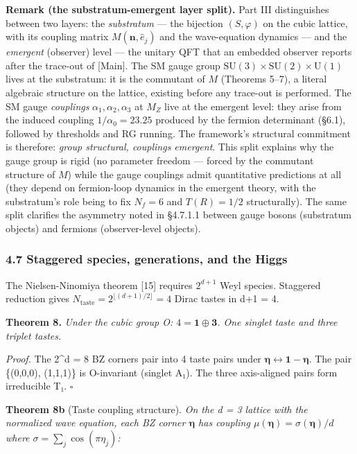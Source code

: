 \documentclass[
]{article}
\begin{document}
\textbf{Remark (the substratum-emergent layer split).} Part III
distinguishes between two layers: the \emph{substratum} --- the
bijection \((S, \varphi)\) on the cubic lattice, with its coupling
matrix \(M(\mathbf{n}, \hat e_j)\) and the wave-equation dynamics ---
and the \emph{emergent} (observer) level --- the unitary QFT that an
embedded observer reports after the trace-out of {[}Main{]}. The SM
gauge group
\(\mathrm{SU}(3) \times \mathrm{SU}(2) \times \mathrm{U}(1)\) lives at
the substratum: it is the commutant of \(M\) (Theorems 5--7), a literal
algebraic structure on the lattice, existing before any trace-out is
performed. The SM gauge \emph{couplings}
\(\alpha_1, \alpha_2, \alpha_3\) at \(M_Z\) live at the emergent level:
they arise from the induced coupling \(1/\alpha_0 = 23.25\) produced by
the fermion determinant (§6.1), followed by thresholds and RG running.
The framework's structural commitment is therefore: \emph{group
structural, couplings emergent}. This split explains why the gauge group
is rigid (no parameter freedom --- forced by the commutant structure of
\(M\)) while the gauge couplings admit quantitative predictions at all
(they depend on fermion-loop dynamics in the emergent theory, with the
substratum's role being to fix \(N_f = 6\) and \(T(R) = 1/2\)
structurally). The same split clarifies the asymmetry noted in §4.7.1.1
between gauge bosons (substratum objects) and fermions (observer-level
objects).

\hypertarget{staggered-species-generations-and-the-higgs}{%
\subsubsection{4.7 Staggered species, generations, and the
Higgs}\label{staggered-species-generations-and-the-higgs}}

The Nielsen-Ninomiya theorem {[}15{]} requires \(2^{d+1}\) Weyl species.
Staggered reduction gives
\(N_{\text{taste}} = 2^{\lfloor(d+1)/2\rfloor} = 4\) Dirac tastes in d+1
= 4.

\textbf{Theorem 8.} \emph{Under the cubic group O:
\(4 = \mathbf{1} \oplus \mathbf{3}\). One singlet taste and three
triplet tastes.}

\emph{Proof.} The 2\^{}d = 8 BZ corners pair into 4 taste pairs under
\(\boldsymbol{\eta} \leftrightarrow \mathbf{1} - \boldsymbol{\eta}\).
The pair \{(0,0,0), (1,1,1)\} is O-invariant (singlet A₁). The three
axis-aligned pairs form irreducible T₁. \(\square\)

\textbf{Theorem 8b} (Taste coupling structure). \emph{On the d = 3
lattice with the normalized wave equation, each BZ corner
\(\boldsymbol{\eta}\) has coupling
\(\mu(\boldsymbol{\eta}) = \sigma(\boldsymbol{\eta})/d\) where
\(\sigma = \sum_j \cos(\pi\eta_j)\):}
\end{document}
